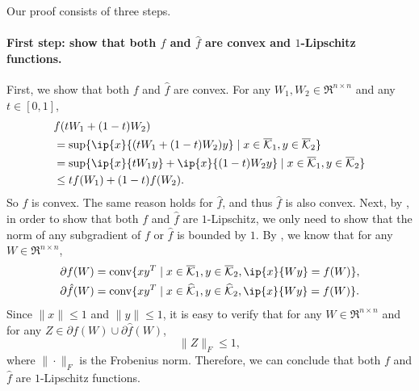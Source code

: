 Our proof consists of three steps. 

\paragraph{First step: show that both $f$ and $\hat f$ are convex and $1$-Lipschitz functions.} First, we show that both $f$ and $\hat f$ are convex. 
For any $W_1, W_2 \in \Re^{n\times n}$ and any $t \in [0,1]$, 
\begin{align*}
  &f(tW_1 + (1-t)W_2) 
  \\&= \sup\{\ip{x}{(tW_1 + (1-t)W_2)y} \mid x \in \overline\Kscr_1, y \in\overline\Kscr_2\}
  \\&= \sup\{\ip{x}{tW_1y} + \ip{x}{(1-t)W_2y} \mid x \in \overline\Kscr_1, y \in\overline\Kscr_2\}
  \\&\leq tf(W_1) + (1-t)f(W_2).
\end{align*}
So $f$ is convex. The same reason holds for $\hat f$, and thus $\hat f$ is also convex. 
Next, by \citep[Lemma~2.6]{shalev2011online}, in order to show that both $f$ and $\hat f$ are $1$-Lipschitz, we only need to show that the norm of any subgradient of $f$ or $\hat f$ is bounded by $1$. By \citep[Theorem~D.4.4.2]{hiriart-urruty01}, we know that for any $W \in \Re^{n\times n}$, 
\begin{align*}
  \partial f(W) &= \conv\{xy^T \mid x \in \overline\Kscr_1, y \in\overline\Kscr_2, \ip{x}{Wy} = f(W)\},
  \\ \partial \hat f(W) &= \conv\{xy^T \mid x \in \widehat\Kscr_1, y \in\widehat\Kscr_2, \ip{x}{Wy} = f(W)\}.
\end{align*}
Since $\|x\| \leq 1$ and $\|y\| \leq 1$, it is easy to verify that for any $W\in\Re^{n\times n}$ and for any $Z \in \partial f(W) \cup \partial \hat f(W)$, 
\[\|Z\|_F \leq 1,\]
where $\|\cdot\|_F$ is the Frobenius norm. Therefore, we can conclude that both $f$ and $\hat f$ are $1$-Lipschitz functions.



